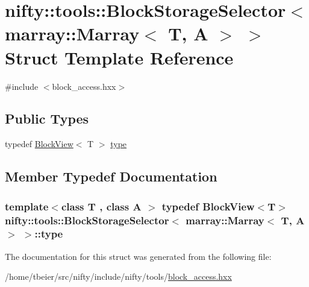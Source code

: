 \hypertarget{structnifty_1_1tools_1_1BlockStorageSelector_3_01marray_1_1Marray_3_01T_00_01A_01_4_01_4}{}\section{nifty\+:\+:tools\+:\+:Block\+Storage\+Selector$<$ marray\+:\+:Marray$<$ T, A $>$ $>$ Struct Template Reference}
\label{structnifty_1_1tools_1_1BlockStorageSelector_3_01marray_1_1Marray_3_01T_00_01A_01_4_01_4}


{\ttfamily \#include $<$block\+\_\+access.\+hxx$>$}

\subsection*{Public Types}
\begin{DoxyCompactItemize}
\item 
typedef \hyperlink{classnifty_1_1tools_1_1BlockView}{Block\+View}$<$ T $>$ \hyperlink{structnifty_1_1tools_1_1BlockStorageSelector_3_01marray_1_1Marray_3_01T_00_01A_01_4_01_4_a7f01429fe6373c157f12ee7c57b6f349}{type}
\end{DoxyCompactItemize}


\subsection{Member Typedef Documentation}
\hypertarget{structnifty_1_1tools_1_1BlockStorageSelector_3_01marray_1_1Marray_3_01T_00_01A_01_4_01_4_a7f01429fe6373c157f12ee7c57b6f349}{}
\subsubsection[{type}]{\setlength{\rightskip}{0pt plus 5cm}template$<$class T , class A $>$ typedef {\bf Block\+View}$<$T$>$ {\bf nifty\+::tools\+::\+Block\+Storage\+Selector}$<$ {\bf marray\+::\+Marray}$<$ T, A $>$ $>$\+::{\bf type}}\label{structnifty_1_1tools_1_1BlockStorageSelector_3_01marray_1_1Marray_3_01T_00_01A_01_4_01_4_a7f01429fe6373c157f12ee7c57b6f349}


The documentation for this struct was generated from the following file\+:\begin{DoxyCompactItemize}
\item 
/home/tbeier/src/nifty/include/nifty/tools/\hyperlink{block__access_8hxx}{block\+\_\+access.\+hxx}\end{DoxyCompactItemize}
